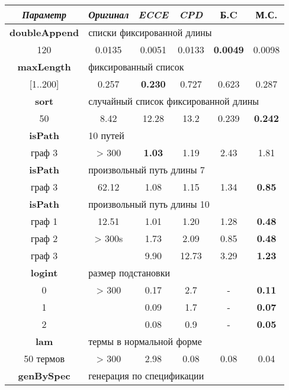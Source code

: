 \begin{table}[h!]
\center
\begin{tabular}{|c|c|c|c|c|c|}
\hline
{\it Параметр} & {\it Оригинал} & {\it ECCE }  & {\it CPD} & {\bf Б.C} & {\bf М.С.} \\ \hline
{\bf doubleAppend} & \multicolumn{5}{|l|}{списки фиксированной длины } \\ \hline
120                & 0.0135 & 0.0051 & 0.0133 & {\bf 0.0049} & 0.0098 \\ \hline


{\bf maxLength} & \multicolumn{5}{|l|}{фиксированный список} \\ \hline

       [1..200] & 0.257 & {\bf 0.230} & 0.727 & 0.623 & 0.287 \\ \hline


{\bf sort} & \multicolumn{5}{|l|}{случайный список фиксированной длины } \\ \hline
50       & 8.42     & 12.28 & 13.2 & 0.239  & {\bf 0.242} \\ \hline

 {\bf isPath} & \multicolumn{5}{|l|}{10 путей} \\ \hline
  граф 3      & > 300 & {\bf 1.03} & 1.19 & 2.43 & 1.81 \\ \hline

 {\bf isPath} & \multicolumn{5}{|l|}{произвольный путь длины 7} \\ \hline
   граф 3     & 62.12 & 1.08 & 1.15 & 1.34 & {\bf 0.85} \\ \hline
 {\bf isPath} & \multicolumn{5}{|l|}{произвольный путь длины 10} \\ \hline
 граф 1  &  12.51  & 1.01 & 1.20 &  1.28 & {\bf 0.48} \\
 граф 2  &  > 300s & 1.73 & 2.09 & 0.85 & {\bf 0.48} \\ 
 граф 3  &         & 9.90 & 12.73& 3.29 & {\bf 1.23} \\
 \hline

{\bf logint} & \multicolumn{5}{|l|}{размер подстановки} \\ \hline
0 & > 300    & 0.17  & 2.7  & -  &  {\bf 0.11} \\
1 &          & 0.09  & 1.7  & -  &  {\bf 0.07} \\
2 &          & 0.08   & 0.9  & -  & {\bf 0.05} \\
\hline

{\bf lam} & \multicolumn{5}{|l|}{термы в нормальной форме} \\ \hline
50 термов & > 300    & 2.98  & 0.08 & 0.08 & 0.04   \\
\hline
{\bf genBySpec} & \multicolumn{5}{|l|}{генерация по спецификации} \\ \hline


\end{tabular}
\end{table}

